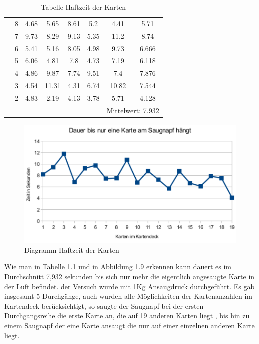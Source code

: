 \begin{table}[H]
{\begin{tabular}{|c|c|c|c|c|c|c|c|}
        & 8  & 4.68         & 5.65         & 8.61         & 5.2          & 4.41                & 5.71             \\ \cline{2-8}
        & 7  & 9.73         & 8.29         & 9.13         & 5.35         & 11.2                & 8.74             \\ \cline{2-8}
        & 6  & 5.41         & 5.16         & 8.05         & 4.98         & 9.73                & 6.666            \\ \cline{2-8}
        & 5  & 6.06         & 4.81         & 7.8          & 4.73         & 7.19                & 6.118            \\ \cline{2-8}
        & 4  & 4.86         & 9.87         & 7.74         & 9.51         & 7.4                 & 7.876            \\ \cline{2-8}
        & 3  & 4.54         & 11.31        & 4.31         & 6.74         & 10.82               & 7.544            \\ \cline{2-8}
        & 2  & 4.83         & 2.19         & 4.13         & 3.78         & 5.71                & 4.128            \\ \cline{2-8}
        &    &              &              &              &              & \multicolumn{2}{c|}{Mittelwert: 7.932} \\ \hline
    \end{tabular}}
    \caption{Tabelle Haftzeit der Karten}
    \label{tab:my-table}
\end{table}

\begin{figure}[H]
    \centering
    \includegraphics[scale=1,page=1]{fig/mech/Haftzeit}
    \caption{Diagramm Haftzeit der Karten}
\end{figure}

Wie man in Tabelle 1.1 und in Abbildung 1.9 erkennen kann dauert es im Durchschnitt 7,932 sekunden bis sich nur mehr die
eigentlich angesaugte Karte in der Luft befindet. der Versuch wurde mit 1Kg Ansaugdruck durchgeführt. Es gab insgesamt
5 Durchgänge, auch wurden alle Möglichkeiten der Kartenanzahlen im Kartendeck berücksichtigt, so saugte der Saugnapf
bei der ersten Durchgangsreihe die erste Karte an, die auf 19 anderen Karten liegt , bis hin zu einem Saugnapf der
eine Karte ansaugt die nur auf einer einzelnen anderen Karte liegt.


